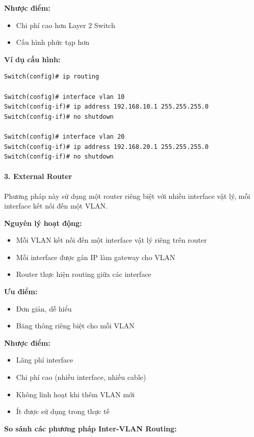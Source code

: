 \textbf{Nhược điểm:}
\begin{itemize}
    \item Chi phí cao hơn Layer 2 Switch
    \item Cấu hình phức tạp hơn
\end{itemize}

\textbf{Ví dụ cấu hình:}
\begin{verbatim}
Switch(config)# ip routing

Switch(config)# interface vlan 10
Switch(config-if)# ip address 192.168.10.1 255.255.255.0
Switch(config-if)# no shutdown

Switch(config)# interface vlan 20
Switch(config-if)# ip address 192.168.20.1 255.255.255.0
Switch(config-if)# no shutdown
\end{verbatim}

\paragraph{3. External Router}
Phương pháp này sử dụng một router riêng biệt với nhiều interface vật lý, mỗi interface kết nối đến một VLAN.

\textbf{Nguyên lý hoạt động:}
\begin{itemize}
    \item Mỗi VLAN kết nối đến một interface vật lý riêng trên router
    \item Mỗi interface được gán IP làm gateway cho VLAN
    \item Router thực hiện routing giữa các interface
\end{itemize}

\textbf{Ưu điểm:}
\begin{itemize}
    \item Đơn giản, dễ hiểu
    \item Băng thông riêng biệt cho mỗi VLAN
\end{itemize}

\textbf{Nhược điểm:}
\begin{itemize}
    \item Lãng phí interface
    \item Chi phí cao (nhiều interface, nhiều cable)
    \item Không linh hoạt khi thêm VLAN mới
    \item Ít được sử dụng trong thực tế
\end{itemize}

\textbf{So sánh các phương pháp Inter-VLAN Routing:}

